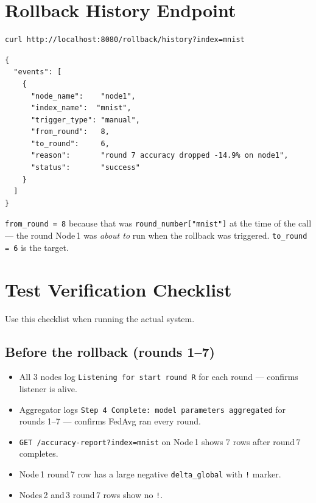 \documentclass[11pt,a4paper]{article}
\begin{document}
\newpage
\section{Rollback History Endpoint}
\label{sec:history}

\begin{lstlisting}[style=bash]
curl http://localhost:8080/rollback/history?index=mnist
\end{lstlisting}

\begin{lstlisting}[style=json]
{
  "events": [
    {
      "node_name":    "node1",
      "index_name":  "mnist",
      "trigger_type": "manual",
      "from_round":   8,
      "to_round":     6,
      "reason":       "round 7 accuracy dropped -14.9% on node1",
      "status":       "success"
    }
  ]
}
\end{lstlisting}

\noindent \texttt{from\_round\,=\,8} because that was
\texttt{round\_number["mnist"]} at the time of the call --- the round
Node\,1 was \emph{about to} run when the rollback was triggered.
\texttt{to\_round\,=\,6} is the target.

\newpage
\section{Test Verification Checklist}
\label{sec:checklist}

Use this checklist when running the actual system.

\subsection{Before the rollback (rounds 1--7)}

\begin{itemize}
  \item[$\square$] All 3 nodes log \texttt{Listening for start round R}
        for each round --- confirms listener is alive.
  \item[$\square$] Aggregator logs \texttt{Step 4 Complete: model parameters
        aggregated} for rounds 1--7 --- confirms FedAvg ran every round.
  \item[$\square$] \texttt{GET /accuracy-report?index=mnist} on Node\,1 shows
        7 rows after round\,7 completes.
  \item[$\square$] Node\,1 round\,7 row has a large negative
        \texttt{delta\_global} with \texttt{!} marker.
  \item[$\square$] Nodes\,2 and\,3 round\,7 rows show no \texttt{!}.
\end{itemize}
\end{document}
